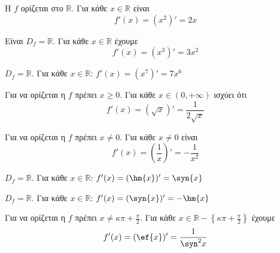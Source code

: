 \begin{alist}
\item Η $ f $ ορίζεται στο $ \mathbb{R} $. Για κάθε $ x\in\mathbb{R} $ είναι
\[ f'(x)=(x^2)'=2x \]
\item Είναι $ D_f=\mathbb{R} $. Για κάθε $ x\in\mathbb{R} $ έχουμε
\[ f'(x)=(x^3)'=3x^2 \]
\item $D_f=\mathbb{R}$. Για κάθε $ x\in\mathbb{R} $: $ f'(x)=(x^7)'=7x^6 $
\item Για να ορίζεται η $ f $ πρέπει $ x\geq 0 $. Για κάθε $ x\in(0,+\infty) $ ισχύει ότι
\[ f'(x)=\left(\sqrt{x}\right)'=\dfrac{1}{2\sqrt{x}} \]
\item Για να ορίζεται η $ f $ πρέπει $ x\neq 0 $. Για κάθε $ x\neq 0 $ είναι
\[ f'(x)=\left(\dfrac{1}{x}\right)'=-\dfrac{1}{x^2} \]
\item $D_f=\mathbb{R}$. Για κάθε $ x\in\mathbb{R} $: $ f'(x)=(\hm{x})'=\syn{x} $
\item $D_f=\mathbb{R}$. Για κάθε $ x\in\mathbb{R} $: $ f'(x)=(\syn{x})'=-\hm{x} $
\item Για να ορίζεται η $ f $ πρέπει $ x\neq\kappa\pi+\frac{\pi}{2} $. Για κάθε $ x\in\mathbb{R}-\left\{\kappa\pi+\frac{\pi}{2}\right\} $ έχουμε
\[ f'(x)=(\ef{x})'=\dfrac{1}{\syn^2{x}} \]
\end{alist}  
